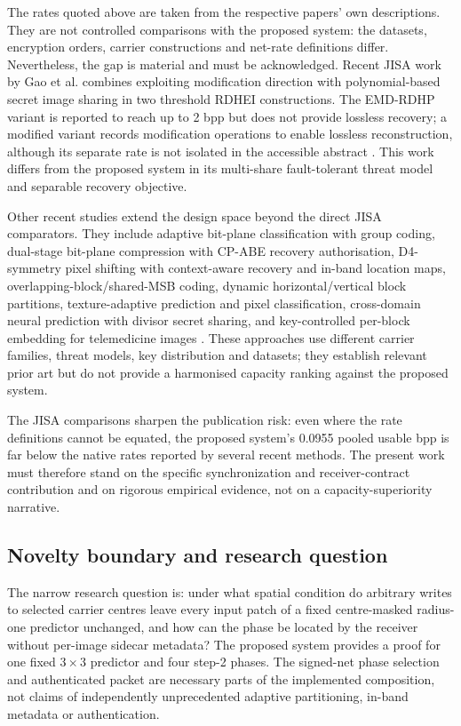 \documentclass[preprint,12pt,a4paper]{elsarticle}
\newcommand{\ProposedSystem}{the proposed system\xspace}
\begin{document}
The rates quoted above are taken from the respective papers' own descriptions. They are not controlled comparisons with \ProposedSystem: the datasets, encryption orders, carrier constructions and net-rate definitions differ. Nevertheless, the gap is material and must be acknowledged. Recent JISA work by Gao et al. combines exploiting modification direction with polynomial-based secret image sharing in two threshold RDHEI constructions. The EMD-RDHP variant is reported to reach up to 2 bpp but does not provide lossless recovery; a modified variant records modification operations to enable lossless reconstruction, although its separate rate is not isolated in the accessible abstract \cite{gao2026emd}. This work differs from the proposed system in its multi-share fault-tolerant threat model and separable recovery objective.



Other recent studies extend the design space beyond the direct JISA comparators. They include adaptive bit-plane classification with group coding, dual-stage bit-plane compression with CP-ABE recovery authorisation, D4-symmetry pixel shifting with context-aware recovery and in-band location maps, overlapping-block/shared-MSB coding, dynamic horizontal/vertical block partitions, texture-adaptive prediction and pixel classification, cross-domain neural prediction with divisor secret sharing, and key-controlled per-block embedding for telemedicine images \cite{zhou2026bitplane,peng2026,hung2026d4,tram2026,lin2026,wang2026apvcpc,shi2026neural,muhudin2026}. These approaches use different carrier families, threat models, key distribution and datasets; they establish relevant prior art but do not provide a harmonised capacity ranking against the proposed system.

The JISA comparisons sharpen the publication risk: even where the rate definitions cannot be equated, the proposed system's 0.0955 pooled usable bpp is far below the native rates reported by several recent methods. The present work must therefore stand on the specific synchronization and receiver-contract contribution and on rigorous empirical evidence, not on a capacity-superiority narrative.

\subsection{Novelty boundary and research question}

The narrow research question is: under what spatial condition do arbitrary writes to selected carrier centres leave every input patch of a fixed centre-masked radius-one predictor unchanged, and how can the phase be located by the receiver without per-image sidecar metadata? The proposed system provides a proof for one fixed $3\times3$ predictor and four step-2 phases. The signed-net phase selection and authenticated packet are necessary parts of the implemented composition, not claims of independently unprecedented adaptive partitioning, in-band metadata or authentication.
\end{document}
